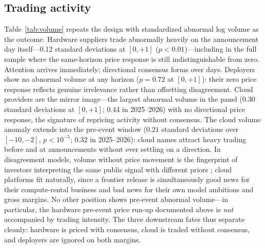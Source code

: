 \documentclass[review,12pt,authoryear]{elsarticle}
\begin{document}
\subsection{Trading activity}

Table~\ref{tab:volume} repeats the design with standardized abnormal log
volume as the outcome. Hardware suppliers trade abnormally heavily on the
announcement day itself---0.12 standard deviations at $[0,+1]$
($p<0.01$)---including in the full sample where the same-horizon price
response is still indistinguishable from zero. Attention arrives immediately;
directional consensus forms over days. Deployers show no abnormal volume at
any horizon ($p=0.72$ at $[0,+1]$): their zero price response reflects genuine
irrelevance rather than offsetting disagreement. Cloud providers are the
mirror image---the largest abnormal volume in the panel (0.30 standard
deviations at $[0,+1]$; 0.44 in 2025--2026) with no directional price
response, the signature of repricing activity without consensus. The cloud
volume anomaly extends into the pre-event window ($0.21$ standard deviations
over $[-10,-2]$, $p<10^{-5}$; $0.32$ in 2025--2026): cloud names attract
heavy trading before and at announcements without ever settling on a
direction. In disagreement models, volume without price movement is the
fingerprint of investors interpreting the same public signal with different
priors \citep{kandel1995}; cloud platforms fit naturally, since a frontier
release is simultaneously good news for their compute-rental business and
bad news for their own model ambitions and gross margins. No other position
shows pre-event abnormal volume---in particular, the hardware pre-event
price run-up documented above is \emph{not} accompanied by trading
intensity. The three downstream fates thus separate cleanly: hardware is
priced with consensus, cloud is traded without consensus, and deployers are
ignored on both margins.
\end{document}
